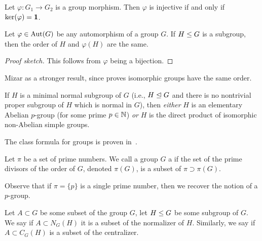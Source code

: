 \begin{theorem}
  Let $\varphi\colon G_{1}\to G_{2}$ is a group morphism.
  Then $\varphi$ is injective if and only if $\ker(\varphi)=\mathbf{1}$.
\end{theorem}


\begin{theorem}\label{thm:pure-math:iso-subgroups-have-same-order}
  Let $\varphi\in\operatorname{Aut}(G)$ be any automorphism of a group $G$.
  If $H\leq G$ is a subgroup, then the order of $H$ and
  $\varphi(H)$ are the same.
\end{theorem}

\begin{proof}[Proof sketch]
This follows from $\varphi$ being a bijection.
\end{proof}

\begin{thm-remark}
Mizar as a stronger result, since
 proves isomorphic groups have the same order.
\end{thm-remark}

\begin{theorem}
  If $H$ is a minimal normal subgroup of $G$ (i.e., $H\trianglelefteq G$
  and there is no nontrivial proper subgroup of $H$ which is normal in
  $G$),
  then \emph{either} $H$ is an elementary Abelian $p$-group (for some
  prime $p\in\mathbb{N}$) \emph{or} $H$ is the direct product of isomorphic
  non-Abelian simple groups.
\end{theorem}

\begin{proposition}
The class formula for groups is proven in~.
\end{proposition}

\begin{definition}
Let $\pi$ be a set of prime numbers. We call a group $G$ a
 if the set of the prime divisors of the order of
$G$, denoted $\pi(G)$, is a subset of $\pi\supset\pi(G)$.
\end{definition}

Observe that if $\pi=\{p\}$ is a single prime number, then we recover
the notion of a $p$-group.

\begin{definition}
Let $A\subset G$ be some subset of the group $G$, let $H\leq G$ 
be some subgroup of $G$.
We say  if $A\subset N_{G}(H)$ it is a subset
of the normalizer of $H$. Similarly, we say 
if $A\subset C_{G}(H)$ is a subset of the centralizer.
\end{definition}

